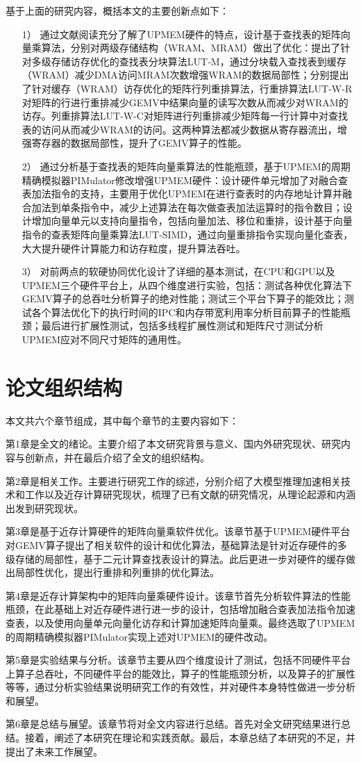 基于上面的研究内容，概括本文的主要创新点如下：
\begin{itemize}
	\item [1）]
	通过文献阅读充分了解了UPMEM硬件的特点，设计基于查找表的矩阵向量乘算法，分别对两级存储结构（WRAM、MRAM）做出了优化：提出了针对多级存储访存优化的查找表分块算法LUT-M，通过分块载入查找表到缓存（WRAM）减少DMA访问MRAM次数增强WRAM的数据局部性；分别提出了针对缓存（WRAM）访存优化的矩阵行列重排算法，行重排算法LUT-W-R对矩阵的行进行重排减少GEMV中结果向量的读写次数从而减少对WRAM的访存。列重排算法LUT-W-C对矩阵进行列重排减少矩阵每一行计算中对查找表的访问从而减少WRAM的访问。这两种算法都减少数据从寄存器流出，增强寄存器的数据局部性，提升了GEMV算子的性能。
	\item [2）]
	通过分析基于查找表的矩阵向量乘算法的性能瓶颈，基于UPMEM的周期精确模拟器PIMulator修改增强UPMEM硬件：设计硬件单元增加了对融合查表加法指令的支持，主要用于优化UPMEM在进行查表时的内存地址计算并融合加法到单条指令中，减少上述算法在每次做查表加法运算时的指令数目；设计增加向量单元以支持向量指令，包括向量加法、移位和重排，设计基于向量指令的查表矩阵向量乘算法LUT-SIMD，通过向量重排指令实现向量化查表，大大提升硬件计算能力和访存粒度，提升算法吞吐。
    \item [3）]
	对前两点的软硬协同优化设计了详细的基本测试，在CPU和GPU以及UPMEM三个硬件平台上，从四个维度进行实验，包括：测试各种优化算法下GEMV算子的总吞吐分析算子的绝对性能；测试三个平台下算子的能效比；测试各个算法优化下的执行时间的IPC和内存带宽利用率分析目前算子的性能瓶颈；最后进行扩展性测试，包括多线程扩展性测试和矩阵尺寸测试分析UPMEM应对不同尺寸矩阵的通用性。
\end{itemize}

\section{论文组织结构}
本文共六个章节组成，其中每个章节的主要内容如下：

第1章是全文的绪论。主要介绍了本文研究背景与意义、国内外研究现状、研究内容与创新点，并在最后介绍了全文的组织结构。

第2章是相关工作。主要进行研究工作的综述，分别介绍了大模型推理加速相关技术和工作以及近存计算研究现状，梳理了已有文献的研究情况，从理论起源和内涵出发到研究现状。

第3章是基于近存计算硬件的矩阵向量乘软件优化。该章节基于UPMEM硬件平台对GEMV算子提出了相关软件的设计和优化算法，基础算法是针对近存硬件的多级存储的局部性，基于二元计算查找表设计的算法。此后更进一步对硬件的缓存做出局部性优化，提出行重排和列重排的优化算法。

第4章是近存计算架构中的矩阵向量乘硬件设计。该章节首先分析软件算法的性能瓶颈，在此基础上对近存硬件进行进一步的设计，包括增加融合查表加法指令加速查表，以及使用向量单元向量化访存和计算加速矩阵向量乘。最终选取了UPMEM的周期精确模拟器PIMulator实现上述对UPMEM的硬件改动。

第5章是实验结果与分析。该章节主要从四个维度设计了测试，包括不同硬件平台上算子总吞吐，不同硬件平台的能效比，算子的性能瓶颈分析，以及算子的扩展性等等，通过分析实验结果说明研究工作的有效性，并对硬件本身特性做进一步分析和展望。

第6章是总结与展望。该章节将对全文内容进行总结。首先对全文研究结果进行总结。接着，阐述了本研究在理论和实践贡献。最后，本章总结了本研究的不足，并提出了未来工作展望。